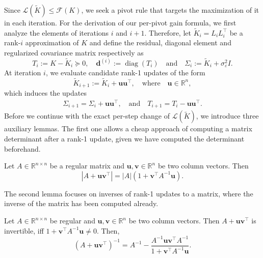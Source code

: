 \documentclass[onefignum,onetabnum]{siamart250211}
\newcommand{\R}{\mathbb{R}}
\DeclareMathOperator{\diag}{diag}
\begin{document}
Since $\mathcal{L}(\widetilde{K}) \leq \mathcal{F}(K)$, we seek a pivot rule that targets the maximization of it in each iteration.
For the derivation of our per-pivot gain formula, we first analyze the elements of iterations $i$ and $i+1$. 
Therefore, let $\widetilde K_i=L_iL_i^\top$ be a rank-$i$ approximation of $K$ and define the residual, diagonal element and regularized covariance matrix respectively as
\begin{equation*}
    T_i := K-\widetilde K_i \succeq 0, 
    \quad
    \bm{d}^{(i)} := \diag(T_i)
    \quad 
    \text{and}
    \quad 
    \Sigma_i := \widetilde{K}_i + \sigma_\varepsilon^2 I.
\end{equation*}
At iteration $i$, we evaluate candidate rank-1 updates of the form
\begin{equation}
    \widetilde K_{i+1} := \widetilde K_i + \bm{u} \bm{u}^\top, 
    \quad 
    \text{where}
    \quad
    \bm{u} \in \mathbb R^n,
\label{eq:candidate-update}
\end{equation}
which induces the updates
\begin{align*}
    \Sigma_{i+1} = \Sigma_i + \bm{u} \bm{u}^\top, \quad \text{and}\quad
    T_{i+1} = T_i - \bm{u} \bm{u}^\top.
\end{align*}
Before we continue with the exact per-step change of $\mathcal{L}(\widetilde{K})$, we introduce three auxiliary lemmas. The first one allows a cheap approach of computing a matrix determinant after a rank-1 update, given we have computed the determinant beforehand.
\begin{lemma} \label{lem:matrixDeterminant}
    Let $A\in\R^{n\times n}$ be a regular matrix and $\bm{u}, \bm{v} \in \R^{n}$ be two column vectors. Then
    \begin{equation*}
        |A + \bm{u}\bm{v}^\top| = |A| (1+\bm{v}^\top A^{-1} \bm{u}).
    \end{equation*}
\end{lemma}
The second lemma focuses on inverses of rank-1 updates to a matrix, where the inverse of the matrix has been computed already.
\begin{lemma}\label{lem:ShermanMorrison}
    Let $A\in \R^{n\times n }$ be regular and $\bm{u}, \bm{v} \in \R^n$ be two column vectors. Then $A + \bm{uv}^\top$ is invertible, iff $1 + \bm{v}^\top A^{-1} \bm{u} \neq 0$. Then,
    \begin{equation*}
        (A + \bm{uv}^\top)^{-1} = A^{-1} - \frac{A^{-1}\bm{uv}^\top A^{-1}}{1+\bm{v}^\top A^{-1}\bm{u}}.
    \end{equation*}
\end{lemma}
\end{document}
